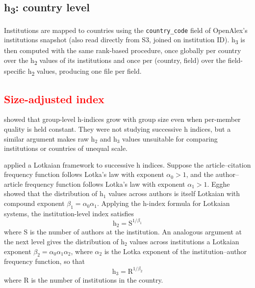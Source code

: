 \subsection{h\textsubscript{3}: country level}
Institutions are mapped to countries using the \texttt{country\_code} field of OpenAlex's institutions snapshot (also read directly from S3, joined on institution ID). h\textsubscript{3} is then computed with the same rank-based procedure, once globally per country over the h\textsubscript{2} values of its institutions and once per (country, field) over the field-specific h\textsubscript{2} values, producing one file per field.

\subsection{\textcolor{red}{Size-adjusted index}}
\label{subsec:methods-efficiency}
\cite{mryglod2022} showed that group-level h-indices grow with group size even when per-member quality is held constant. They were not studying successive h indices, but a similar argument makes raw $\mathrm{h}_2$ and $\mathrm{h}_3$ values unsuitable for comparing institutions or countries of unequal scale.

\cite{egghe2008} applied a Lotkaian framework to successive h indices. Suppose the article--citation frequency function follows Lotka's law with exponent $\alpha_0 > 1$, and the author--article frequency function follows Lotka's law with exponent $\alpha_1 > 1$. Egghe showed that the distribution of $\mathrm{h}_1$ values across authors is itself Lotkaian with compound exponent $\beta_1 = \alpha_0\alpha_1$. Applying the h-index formula for Lotkaian systems, the institution-level index satisfies
\begin{equation}
	\mathrm{h}_2 = \mathrm{S}^{1/\beta_1}
	\label{eq:h2-scaling}
\end{equation}
where S is the number of authors at the institution. An analogous argument at the next level gives the distribution of $\mathrm{h}_2$ values across institutions a Lotkaian exponent $\beta_2 = \alpha_0\alpha_1\alpha_2$, where $\alpha_2$ is the Lotka exponent of the institution--author frequency function, so that
\begin{equation}
	\mathrm{h}_3 = \mathrm{R}^{1/\beta_2}
	\label{eq:h3-scaling}
\end{equation}
where R is the number of institutions in the country.

